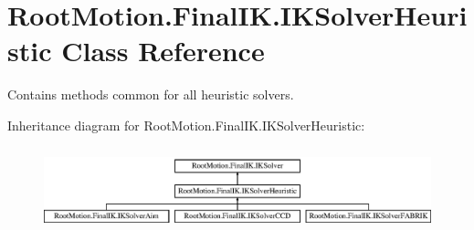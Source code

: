 \hypertarget{class_root_motion_1_1_final_i_k_1_1_i_k_solver_heuristic}{}\section{Root\+Motion.\+Final\+I\+K.\+I\+K\+Solver\+Heuristic Class Reference}
\label{class_root_motion_1_1_final_i_k_1_1_i_k_solver_heuristic}


Contains methods common for all heuristic solvers.  


Inheritance diagram for Root\+Motion.\+Final\+I\+K.\+I\+K\+Solver\+Heuristic\+:\begin{figure}[H]
\begin{center}
\leavevmode
\includegraphics[height=2.456140cm]{class_root_motion_1_1_final_i_k_1_1_i_k_solver_heuristic}
\end{center}
\end{figure}
